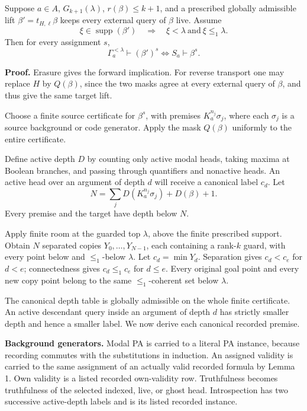 \documentclass[
  11pt,
  letterpaper,
]{article}
\begin{document}
Suppose \(a\in A\), \(G_{k+1}(\lambda)\), \(r(\beta)\leq k+1\), and a
prescribed globally admissible lift \(\beta'=t_{H,\ell}\beta\) keeps
every external query of \(\beta\) live. Assume \[
\xi\in\operatorname{supp}(\beta')
\quad\Longrightarrow\quad \xi<\lambda\ \text{and}\ \xi\leq_1\lambda.
\] Then for every assignment \(s\), \[
\Gamma_a^{<\lambda}\vdash(\beta')^s
\iff S_a\vdash\beta^s.
\tag{4}
\]

\textbf{Proof.} Erasure gives the forward implication. For reverse
transport one may replace \(H\) by \(Q(\beta)\), since the two masks
agree at every external query of \(\beta\), and thus give the same
target lift.

Choose a finite source certificate for \(\beta^s\), with premises
\(K_a^{n_j}\sigma_j\), where each \(\sigma_j\) is a source background or
code generator. Apply the mask \(Q(\beta)\) uniformly to the entire
certificate.

Define active depth \(D\) by counting only active modal heads, taking
maxima at Boolean branches, and passing through quantifiers and
nonactive heads. An active head over an argument of depth \(d\) will
receive a canonical label \(c_d\). Let \[
N=\sum_j D(K_a^{n_j}\sigma_j)+D(\beta)+1.
\] Every premise and the target have depth below \(N\).

Apply finite room at the guarded top \(\lambda\), above the finite
prescribed support. Obtain \(N\) separated copies
\(Y_0,\ldots,Y_{N-1}\), each containing a rank-\(k\) guard, with every
point below and \(\leq_1\)-below \(\lambda\). Let \(c_d=\min Y_d\).
Separation gives \(c_d<c_e\) for \(d<e\); connectedness gives
\(c_d\leq_1c_e\) for \(d\leq e\). Every original goal point and every
new copy point belong to the same \(\leq_1\)-coherent set below
\(\lambda\).

The canonical depth table is globally admissible on the whole finite
certificate. An active descendant query inside an argument of depth
\(d\) has strictly smaller depth and hence a smaller label. We now
derive each canonical recorded premise.

\textbf{Background generators.} Modal PA is carried to a literal PA
instance, because recording commutes with the substitutions in
induction. An assigned validity is carried to the same assignment of an
actually valid recorded formula by Lemma 1. Own validity is a listed
recorded own-validity row. Truthfulness becomes truthfulness of the
selected indexed, live, or ghost head. Introspection has two successive
active-depth labels and is its listed recorded instance.
\end{document}
